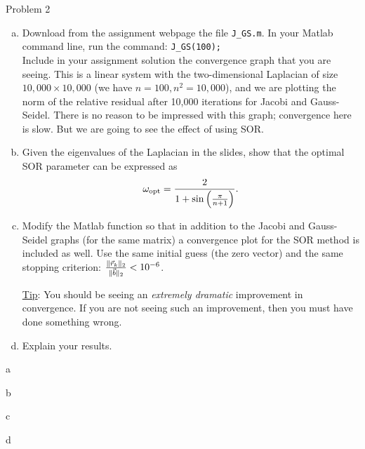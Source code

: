 \begin{section}{Problem 2}
    \begin{problem}{2}
        \begin{enumerate}[(a)]
            \item Download from the assignment webpage the file {\tt J\_GS.m}. In your {\sc Matlab} command line, run the command: {\tt J\_GS(100);} \\
            Include in your assignment solution the convergence graph that you are seeing. This is a linear system with the two-dimensional Laplacian of size $10,000 \times 10,000$ (we have $n=100, n^2=10,000$), and we are plotting the norm of the relative residual after 10,000 iterations for Jacobi and Gauss-Seidel. There is no reason to be impressed with this graph; convergence here is slow. But we are going to see  the effect of using SOR.
            \item Given the eigenvalues of the Laplacian in the slides, show that the optimal SOR parameter can be expressed as
            $$ \omega_{\rm opt} = \frac{2}{1+\sin \left( \frac{\pi}{n+1} \right)}.$$
            \item
            Modify the  {\sc Matlab} function so that in addition to the Jacobi and Gauss-Seidel graphs (for the same matrix) a convergence plot for the SOR method is included as well. Use the same initial guess (the zero vector) and the same stopping criterion: $\frac{\| \vec{r}_k \|_2}{\| \vec{b} \|_2} < 10^{-6}$. 
            
            {\underline {Tip}:} You should be seeing an {\em extremely dramatic} improvement in convergence. If you are not seeing such an improvement, then you must have done something wrong.
            \item Explain your results. 
        \end{enumerate}
    \end{problem}

    \begin{solution}{a}
    \end{solution}

    \newpage
    
    \begin{solution}{b}
    \end{solution}

    \newpage
    
    \begin{solution}{c}
    \end{solution}

    \newpage
    
    \begin{solution}{d}
    \end{solution}

\end{section}